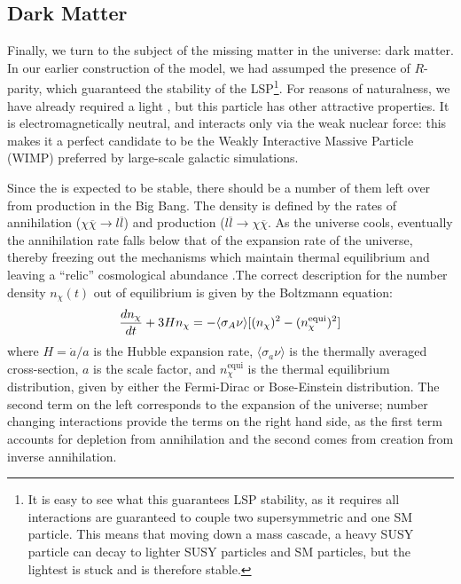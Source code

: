 
\subsection{Dark Matter}

Finally, we turn to the subject of the missing matter in the universe: dark matter. In our earlier construction of the model, we had assumped the presence of $R$-parity, which guaranteed the stability of the LSP\footnote{It is easy to see what this guarantees LSP stability, as it requires all interactions are guaranteed to couple two supersymmetric and one SM particle. This means that moving down a mass cascade, a heavy SUSY particle can decay to lighter SUSY particles and SM particles, but the lightest is stuck and is therefore stable.}. For reasons of naturalness, we have already required a light \lsp, but this particle has other attractive properties. It is electromagnetically neutral, and interacts only via the weak nuclear force: this makes it a perfect candidate to be the Weakly Interactive Massive Particle (WIMP) preferred by large-scale galactic simulations.  

Since the \lsp is expected to be stable, there should be a number of them left over from production in the Big Bang. The density is defined by the rates of annihilation ($\chi\overline{\chi} \rightarrow l \overline{l}$) and production ($l\overline{l}\rightarrow \chi\overline{\chi}$. As the universe cools, eventually the annihilation rate falls below that of the expansion rate of the universe, thereby freezing out the mechanisms which maintain thermal equilibrium and leaving a ``relic'' cosmological abundance \cite{Jungman}.The correct description for the number density $n_\chi(t)$ out of equilibrium is given by the Boltzmann equation:
\begin{align}
  \frac{d n_\chi}{d t} + 3 H n_\chi = - \langle \sigma_A \nu \rangle [(n_\chi)^2 - (n_\chi^\mathrm{equi})^2]\label{eqn:boltz}
\end{align}
where $H=\dot{a}/a$ is the Hubble expansion rate, $\langle\sigma_a \nu\rangle$ is the thermally averaged cross-section, $a$ is the scale factor, and $n_\chi^\mathrm{equi}$ is the thermal equilibrium distribution, given by either the Fermi-Dirac or Bose-Einstein distribution. The second term on the left corresponds to the expansion of the universe; number changing interactions provide the terms on the right hand side, as the first term accounts for depletion from annihilation and the second comes from creation from inverse annihilation. 

